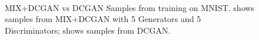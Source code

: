 \documentclass{article}
\begin{document}
\begin{figure}[!htb]%
  \centering
  \hspace{8pt}%
  \\
  \caption[Figure 4]{MIX+DCGAN vs DCGAN Samples from training on MNIST. 
     shows samples from MIX+DCGAN with 5 Generators and 5 Discriminators;  shows samples from DCGAN.
  }
  \label{fig:ex4}%
\end{figure}
\end{document}
